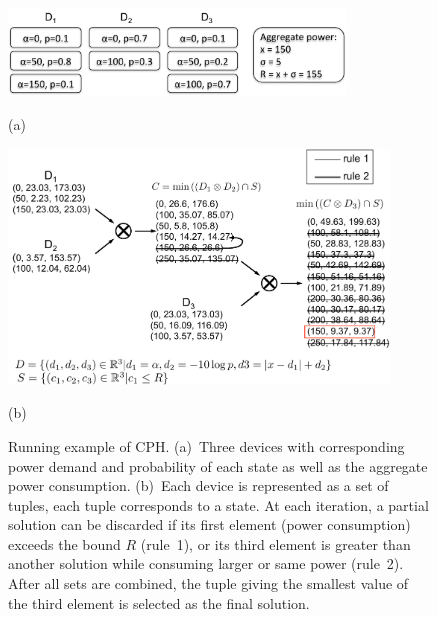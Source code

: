 \begin{figure}[h]
\begin{minipage}[b]{1\linewidth}
  \centering
  \centerline{\includegraphics[width=0.8\textwidth]{./chapters/chapter4/images/cph1}}
  \centerline{(a)}\medskip
\end{minipage}
\begin{minipage}[b]{1\linewidth}
  \centering
  \centerline{\includegraphics[width=0.9\textwidth]{./chapters/chapter4/images/cph2}}
  \centerline{(b)}\medskip
\end{minipage}
\caption{Running example of CPH. (a)~Three devices with corresponding power demand and probability of each state as well as the aggregate power consumption. (b)~Each device is represented as a set of tuples, each tuple corresponds to a state. At each iteration, a partial solution can be discarded if its first element (power consumption) exceeds the bound $R$ (rule~1), or its third element is greater than another solution while consuming larger or same power (rule~2). After all sets are combined, the tuple giving the smallest value of the third element is selected as the final solution.} 
\label{fig:SS2} 
\end{figure}

